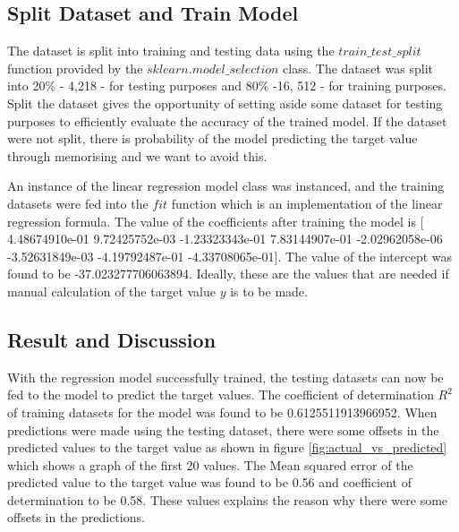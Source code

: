 \documentclass[conference]{IEEEtran}
\begin{document}
\subsection{Split Dataset and Train Model}
The dataset is split into training and testing data using the $train\_test\_split$ function provided by the $sklearn.model\_selection$ class. The dataset was split into 20\% - 4,218 - for testing purposes and 80\% -16, 512 - for training purposes. Split the dataset gives the opportunity of setting aside some dataset for testing purposes to efficiently evaluate the accuracy of the trained model. If the dataset were not split, there is probability of the model predicting the target value through memorising and we want to avoid this. 

An instance of the linear regression model class was instanced, and the training datasets were fed into the $fit$ function which is an implementation of the linear regression formula. The value of the coefficients after training the model is [ 4.48674910e-01  9.72425752e-03 -1.23323343e-01  7.83144907e-01
 -2.02962058e-06 -3.52631849e-03 -4.19792487e-01 -4.33708065e-01]. The value of the intercept was found to be -37.023277706063894. Ideally, these are the values that are needed if manual calculation of the target value $y$ is to be made. 

\subsection{Result and Discussion}
With the regression model successfully trained, the testing datasets can now be fed to the model to predict the target values. The coefficient of determination $R^2$ of training datasets for the model was found to be 0.6125511913966952.
When predictions were made using the testing dataset, there were some offsets in the predicted values to the target value as shown in figure \ref{fig:actual_vs_predicted}  which shows a graph of the first 20 values. The Mean squared error of the predicted value to the target value was found to be 0.56 and coefficient of determination to be 0.58. These values explains the reason why there were some offsets in the predictions.
\end{document}

